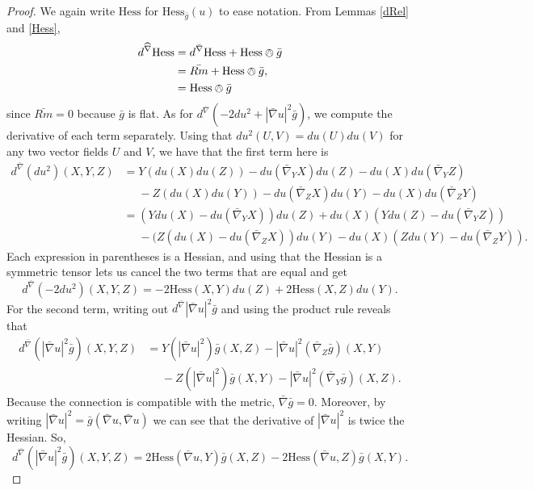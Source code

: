 \documentclass{amsart}
\begin{document}
\begin{proof}
We again write $\mathrm{Hess}$ for $\mathrm{Hess}_{\bar{g}}(u)$ to ease notation. 
From Lemmas \ref{dRel} and \ref{Hess}, 
\begin{equation}
\label{SimpDerHess}
\begin{aligned}
d^{\widehat{\nabla}}\mathrm{Hess} 
&= d^{\bar{\nabla}}\mathrm{Hess} + \mathrm{Hess}\owedge \bar{g} \\
&= \bar{Rm} + \mathrm{Hess}\owedge \bar{g}, \\
&= \mathrm{Hess}\owedge \bar{g}
\end{aligned}
\end{equation}
since $\bar{Rm} = 0$ because $\bar{g}$ is flat. 
As for $d^{\bar{\nabla}}(- 2 du^2 + |\bar{\nabla}u|^2 \bar{g})$, we compute the derivative of each term separately.
Using that $du^2(U,V) = du(U)du(V)$ for any two vector fields $U$ and $V$, we have that the first term here is 
\begin{align*}
d^{\bar{\nabla}}(du^2)(X,Y,Z)
&= Y(du(X)du(Z)) - du(\bar{\nabla}_YX)du(Z) - du(X)du(\bar{\nabla}_YZ) \\
&\phantom{=} - Z(du(X)du(Y)) - du(\bar{\nabla}_ZX)du(Y) - du(X)du(\bar{\nabla}_ZY) \\[2mm]
&= (Ydu(X) - du(\bar{\nabla}_YX))du(Z) + du(X)(Ydu(Z)-du(\bar{\nabla}_YZ)) \\
&\phantom{=} - (Z(du(X) - du(\bar{\nabla}_ZX))du(Y) - du(X)(Zdu(Y)-du(\bar{\nabla}_ZY)).
\end{align*}
Each expression in parentheses is a Hessian, and using that the Hessian is a symmetric tensor lets us cancel the two terms that are equal and get 
\begin{equation}
\label{Derdu}
d^{\bar{\nabla}}(-2du^2)(X,Y,Z) = -2\mathrm{Hess}(X,Y)du(Z) +2\mathrm{Hess}(X,Z)du(Y).
\end{equation}
For the second term, writing out $d^{\bar{\nabla}}|\bar{\nabla}u|^2 \bar{g}$ and using the product rule reveals that 
\begin{align*}
d^{\bar{\nabla}}(|\bar{\nabla}u|^2 \bar{g})(X,Y,Z) 
&= Y(|\bar{\nabla}u|^2)\bar{g}(X,Z) - |\bar{\nabla}u|^2 (\bar{\nabla}_Z\bar{g})(X,Y) \\
&\phantom{=} - Z(|\bar{\nabla}u|^2)\bar{g}(X,Y) - |\bar{\nabla}u|^2(\bar{\nabla}_Y\bar{g})(X,Z).
\end{align*}
Because the connection is compatible with the metric, $\bar{\nabla}\bar{g} = 0$. 
Moreover, by writing $|\bar{\nabla}u|^2 = \bar{g}(\bar{\nabla} u, \bar{\nabla}u)$ we can see that the derivative of $|\bar{\nabla}u|^2$ is twice the Hessian.
So, 
\begin{equation}
\label{DerNorm}
d^{\bar{\nabla}}(|\bar{\nabla} u|^2\bar{g})(X,Y,Z)
= 2\mathrm{Hess}(\bar{\nabla}u,Y)\bar{g}(X,Z) - 2\mathrm{Hess}(\bar{\nabla}u,Z)\bar{g}(X,Y).
\end{equation}


\end{proof}
\end{document}
